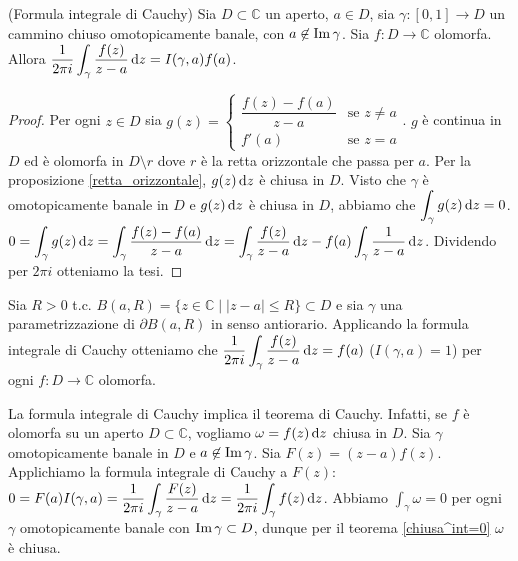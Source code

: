 \begin{thm}
  (Formula integrale di Cauchy) Sia $D \subset \mathbb{C}$ un aperto, $a \in D$, sia $\gamma:[0,1] \longrightarrow D$ un cammino chiuso omotopicamente banale, con $a \not\in \operatorname{Im}{\gamma}$. Sia $f:D \longrightarrow \mathbb{C}$ olomorfa. Allora $\displaystyle \frac{1}{2\pi i}\int_{\gamma} \frac{f(z)}{z-a}\mathop{}\!\mathrm{d} z=I(\gamma, a)f(a)$.
\end{thm}

\begin{proof}
  Per ogni $z \in D$ sia $g(z)=\begin{cases}
    \dfrac{f(z)-f(a)}{z-a} & \mbox{se }z\not=a\\
    f'(a) & \mbox{se }z=a
\end{cases}$. $g$ è continua in $D$ ed è olomorfa in $D \setminus r$ dove $r$ è la retta orizzontale che passa per $a$.
Per la proposizione \ref{retta_orizzontale}, $g(z)\mathop{}\!\mathrm{d} z$ è chiusa in $D$. Visto che $\gamma$ è omotopicamente banale in $D$ e $g(z)\mathop{}\!\mathrm{d} z$ è chiusa in $D$, abbiamo che $\displaystyle \int_{\gamma}g(z)\mathop{}\!\mathrm{d} z=0$.
$\displaystyle 0=\int_{\gamma} g(z)\mathop{}\!\mathrm{d} z=\int_{\gamma} \frac{f(z)-f(a)}{z-a}\mathop{}\!\mathrm{d} z=\int_{\gamma} \frac{f(z)}{z-a}\mathop{}\!\mathrm{d} z-f(a)\int_{\gamma} \frac{1}{z-a}\mathop{}\!\mathrm{d} z$. Dividendo per $2\pi i$ otteniamo la tesi.
\end{proof}

\begin{ex}
  Sia $R>0$ t.c. $B(a,R)=\{z\in \mathbb{C}\mid |z-a|\le R\} \subset D$ e sia $\gamma$ una parametrizzazione di $\partial B(a,R)$ in senso antiorario. Applicando la formula integrale di Cauchy otteniamo che $\displaystyle \frac{1}{2\pi i}\int_{\gamma} \frac{f(z)}{z-a}\mathop{}\!\mathrm{d} z=f(a)$ ($I(\gamma,a)=1$) per ogni $f:D \longrightarrow \mathbb{C}$ olomorfa.
\end{ex}

\begin{oss}
  La formula integrale di Cauchy implica il teorema di Cauchy. Infatti, se $f$ è olomorfa su un aperto $D\subset \mathbb{C}$, vogliamo $\omega=f(z)\mathop{}\!\mathrm{d} z$ chiusa in $D$. Sia $\gamma$ omotopicamente banale in $D$ e $a \not\in \operatorname{Im}{\gamma}$. Sia $F(z)=(z-a)f(z)$.
  Applichiamo la formula integrale di Cauchy a $F(z)$: $\displaystyle 0=F(a)I(\gamma, a)=\frac{1}{2\pi i}\int_{\gamma} \frac{F(z)}{z-a}\mathop{}\!\mathrm{d} z=\frac{1}{2\pi i}\int_{\gamma}f(z)\mathop{}\!\mathrm{d} z$.
  Abbiamo $\displaystyle\int_{\gamma}\omega=0$ per ogni $\gamma$ omotopicamente banale con $\operatorname{Im}{\gamma} \subset D$, dunque per il teorema \ref{chiusa^int=0} $\omega$ è chiusa.
\end{oss}

